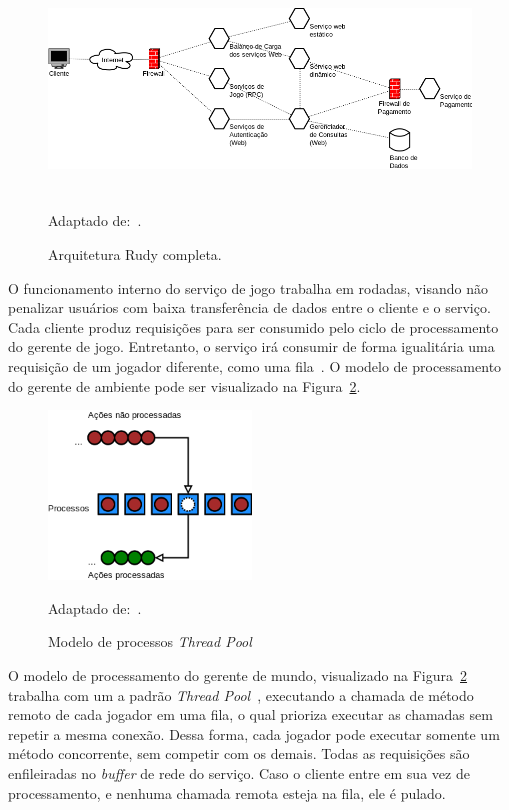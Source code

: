 \begin{figure}[htb!]
  \caption{Arquitetura Rudy completa.}
  \label{full_rudy_fw}
  \includegraphics[height=5.5cm]{arquiteturas/full_rudy_fw.png}
  \centering

  Adaptado de:~\cite{matthiasrudy2011}.
\end{figure}




O funcionamento interno do serviço de jogo trabalha em rodadas, visando não penalizar usuários com baixa transferência de dados entre o cliente e o serviço.
%
Cada cliente produz requisições para ser consumido pelo ciclo de processamento do gerente de jogo.
%
Entretanto, o serviço irá consumir de forma igualitária uma requisição de um jogador diferente, como uma fila~\cite{albion_online_unite, matthiasrudy2011}.
%
O modelo de processamento do gerente de ambiente pode ser visualizado na Figura~\ref{fig:thread_pool}.


\begin{figure}[htb!]
  \caption{Modelo de processos \textit{Thread Pool}}
  \label{fig:thread_pool}
  \includegraphics[height=4.5cm]{arquiteturas/thread_pool.png}
  \centering

  Adaptado de:~\cite{matthiasrudy2011, Ringler2014Dec}.
\end{figure}

O modelo de processamento do gerente de mundo, visualizado na Figura~\ref{fig:thread_pool} trabalha com um a padrão \textit{Thread Pool}~\cite{Ringler2014Dec, matthiasrudy2011}, executando a chamada de método remoto de cada jogador em uma fila, o qual prioriza executar as chamadas sem repetir a mesma conexão.
%
Dessa forma, cada jogador pode executar somente um método concorrente, sem competir com os demais. Todas as requisições são enfileiradas no \textit{buffer} de rede do serviço.
%
Caso o cliente entre em sua vez de processamento, e nenhuma chamada remota esteja na fila, ele é pulado.




